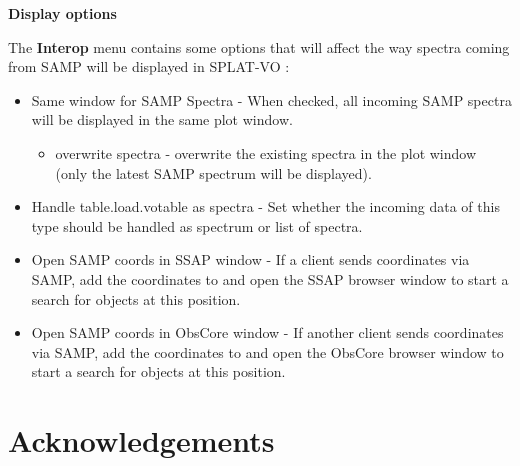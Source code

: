 \documentclass[twoside,11pt,nolof]{starlink}
\providecommand{\SPLAT}{\textsf{SPLAT-VO }}
\renewcommand{\menuitem}[1]{\textbf{#1}}
\providecommand{\subheading}[1]{\textbf{\large{#1}}}
\begin{document}
\subheading{Display options}

The \menuitem{Interop} menu contains some options that will affect the way spectra coming
from SAMP will be displayed in \SPLAT:
\begin{itemize}
 \item Same window for SAMP Spectra - When checked, all incoming SAMP spectra will be displayed in the same plot window.
  \begin{itemize}
  \item overwrite spectra - overwrite the existing spectra in the plot window (only the latest SAMP spectrum will be displayed).
  \end{itemize}
\item Handle table.load.votable as spectra - Set whether the  incoming data of this type should be handled as spectrum or list of spectra. 
\item Open SAMP coords in SSAP window - If a client sends coordinates via SAMP, add the coordinates to and open the SSAP browser window to start a search for objects at this position.
\item Open SAMP coords in ObsCore window - If another client sends coordinates via SAMP, add the coordinates to and open the ObsCore browser window to start a search for objects at this position.

\end{itemize}

\newpage
\section{Acknowledgements}
\end{document}
